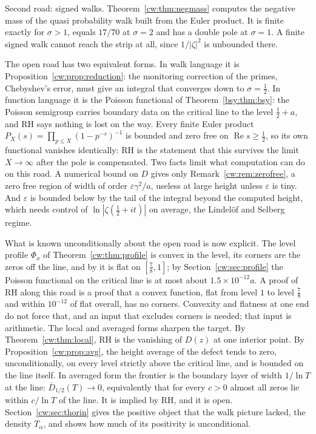 Second road: signed walks. Theorem~\ref{cw:thm:negmass} computes the negative mass of the quasi probability walk built from the Euler product. It is finite exactly for $\sigma>1$, equals $17/70$ at $\sigma=2$ and has a double pole at $\sigma=1$. A finite signed walk cannot reach the strip at all, since $1/|\zeta|^2$ is unbounded there.

The open road has two equivalent forms. In walk language it is Proposition~\ref{cw:prop:reduction}: the monitoring correction of the primes, Chebyshev's error, must give an integral that converges down to $\sigma=\frac12$. In function language it is the Poisson functional of Theorem~\ref{bsy:thm:bsy}: the Poisson semigroup carries boundary data on the critical line to the level $\frac12+a$, and RH says nothing is lost on the way. Every finite Euler product $P_X(s)=\prod_{p\le X}(1-p^{-s})^{-1}$ is bounded and zero free on $\operatorname{Re}s\ge\frac12$, so its own functional vanishes identically: RH is the statement that this survives the limit $X\to\infty$ after the pole is compensated. Two facts limit what computation can do on this road. A numerical bound on $D$ gives only Remark~\ref{cw:rem:zerofree}, a zero free region of width of order $\varepsilon\gamma^2/a$, useless at large height unless $\varepsilon$ is tiny. And $\varepsilon$ is bounded below by the tail of the integral beyond the computed height, which needs control of $\ln|\zeta(\frac12+it)|$ on average, the Lindel\"of and Selberg regime.

What is known unconditionally about the open road is now explicit. The level profile $\Phi_x$ of Theorem~\ref{cw:thm:profile} is convex in the level, its corners are the zeros off the line, and by \cite{OAI26a} it is flat on $[\frac78,1]$; by Section~\ref{cw:sec:profile} the Poisson functional on the critical line is at most about $1.5\times10^{-12}a$. A proof of RH along this road is a proof that a convex function, flat from level $1$ to level $\frac78$ and within $10^{-12}$ of flat overall, has no corners. Convexity and flatness at one end do not force that, and an input that excludes corners is needed; that input is arithmetic. The local and averaged forms sharpen the target. By Theorem~\ref{cw:thm:local}, RH is the vanishing of $D(z)$ at one interior point. By Proposition~\ref{cw:prop:avg}, the height average of the defect tends to zero, unconditionally, on every level strictly above the critical line, and is bounded on the line itself. In averaged form the frontier is the boundary layer of width $1/\ln T$ at the line: $\bar D_{1/2}(T)\to0$, equivalently that for every $c>0$ almost all zeros lie within $c/\ln T$ of the line. It is implied by RH, and it is open. Section~\ref{cw:sec:thorin} gives the positive object that the walk picture lacked, the density $T_\alpha$, and shows how much of its positivity is unconditional.

